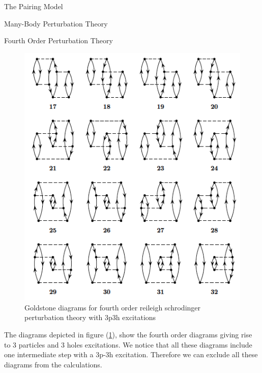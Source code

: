 \documentclass[twoside,english]{uiofysmaster}
\begin{document}
\begin{chapter}{The Pairing Model}
\begin{section}{Many-Body Perturbation Theory}
\begin{subsection}{Fourth Order Perturbation Theory}
			\begin{figure}[H]
				\includegraphics[width=\textwidth]{Figures/fourthorder3p3h.png}
				\caption{Goldstone diagrams for fourth order reileigh schrodinger perturbation theory with 3p3h excitations}
				\label{figure:mbpt3p3h}
			\end{figure}
			The diagrams depicted in figure (\ref{figure:mbpt3p3h}), show the fourth order diagrams giving rise to 3 particles and 3 holes excitations. We notice that all these diagrams include one intermediate step with a 3p-3h excitation. Therefore we can exclude all these diagrams from the calculations.  


\end{subsection}
\end{section}
\end{chapter}
\end{document}
